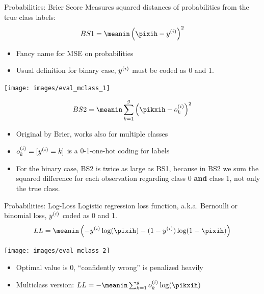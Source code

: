 \documentclass[11pt,compress,t,notes=noshow, xcolor=table]{beamer}
\newenvironment{knitrout}{}{} %
\begin{document}
\begin{vbframe}{Probabilities: Brier Score}
Measures squared distances of probabilities from the true class labels:
\[
BS1 = \meanin \left( \pixih - \yi \right)^2
\]


\begin{itemize}
  \item Fancy name for MSE on probabilities
  \item Usual definition for binary case, $y^{(i)}$ must be coded as 0 and 1.
\end{itemize}

\begin{knitrout}\scriptsize
{}\color{fgcolor}

{\centering \texttt{[image: images/eval\_mclass\_1]} 

}



\end{knitrout}


\framebreak

\[
BS2 = \meanin \sum_{k=1}^g \left( \pikxih - o_k^{(i)} \right)^2
\]
\begin{itemize}
  \item Original by Brier, works also for multiple classes
  \item $ o_k^{(i)} = [ y^{(i)} = k ] $ is a 0-1-one-hot coding for labels
  \item For the binary case, BS2 is twice as large as BS1, because in BS2 we sum the squared
    difference for each observation regarding class 0 \textbf{and} class 1, not only the true class.
\end{itemize}


\end{vbframe}

\begin{vbframe}{Probabilities: Log-Loss}
Logistic regression loss function, a.k.a. Bernoulli or binomial loss, $y^{(i)}$ coded as 0 and 1.
\[
LL = \meanin \left( - \yi \log(\pixih) - (1-\yi) \log(1-\pixih) \right)
\]
\begin{knitrout}\scriptsize
{}\color{fgcolor}

{\centering \texttt{[image: images/eval\_mclass\_2]}  

}



\end{knitrout}
\begin{itemize}
  \item Optimal value is 0, \enquote{confidently wrong} is penalized heavily
  \item Multiclass version: $ LL = - \meanin \sum_{k=1}^g o_k^{(i)} \log(\pikxih) $
\end{itemize}
\end{vbframe}


\endlecture
\end{document}
